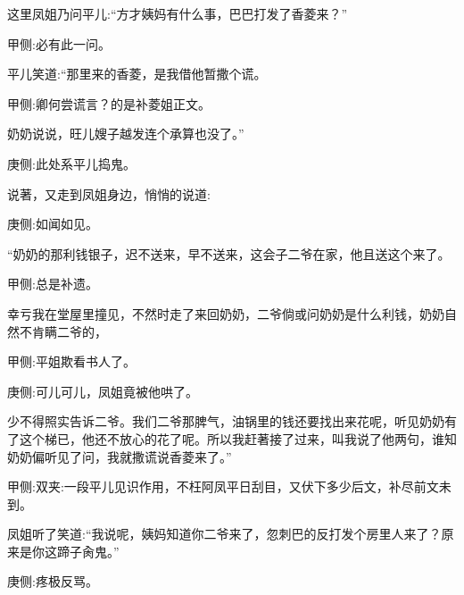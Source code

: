 \begin{parag}
    这里凤姐乃问平儿:“方才姨妈有什么事，巴巴打发了香菱来？”\begin{note}甲侧:必有此一问。\end{note}平儿笑道:“那里来的香菱，是我借他暂撒个谎。\begin{note}甲侧:卿何尝谎言？的是补菱姐正文。\end{note}奶奶说说，旺儿嫂子越发连个承算也没了。”\begin{note}庚侧:此处系平儿捣鬼。\end{note}说著，又走到凤姐身边，悄悄的说道:\begin{note}庚侧:如闻如见。\end{note}“奶奶的那利钱银子，迟不送来，早不送来，这会子二爷在家，他且送这个来了。\begin{note}甲侧:总是补遗。\end{note}幸亏我在堂屋里撞见，不然时走了来回奶奶，二爷倘或问奶奶是什么利钱，奶奶自然不肯瞒二爷的，\begin{note}甲侧:平姐欺看书人了。\end{note}\begin{note}庚侧:可儿可儿，凤姐竟被他哄了。\end{note}少不得照实告诉二爷。我们二爷那脾气，油锅里的钱还要找出来花呢，听见奶奶有了这个梯已，他还不放心的花了呢。所以我赶著接了过来，叫我说了他两句，谁知奶奶偏听见了问，我就撒谎说香菱来了。”\begin{note}甲侧:双夹:一段平儿见识作用，不枉阿凤平日刮目，又伏下多少后文，补尽前文未到。\end{note}凤姐听了笑道:“我说呢，姨妈知道你二爷来了，忽刺巴的反打发个房里人来了？原来是你这蹄子肏鬼。”\begin{note}庚侧:疼极反骂。\end{note}
\end{parag}


